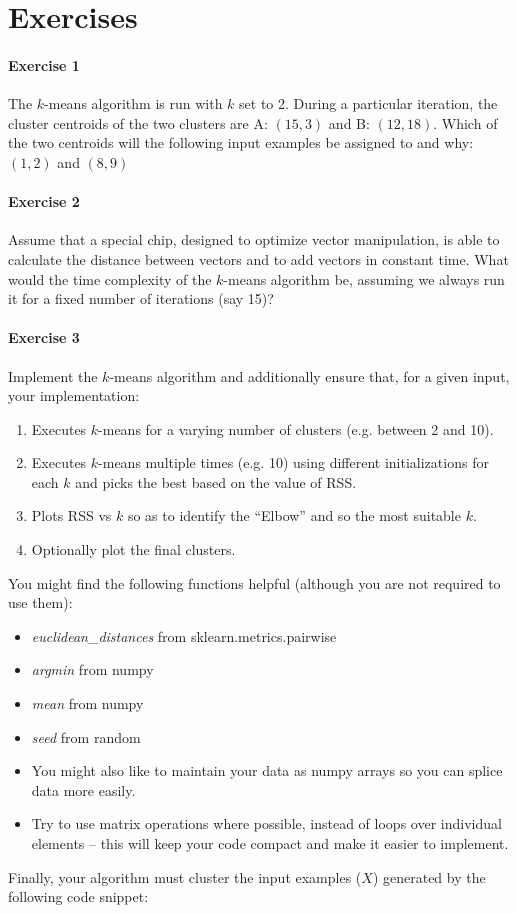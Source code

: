 \section{Exercises}

\paragraph{Exercise 1} 
The $k$-means algorithm is run with $k$ set to 2. During a particular iteration, the cluster centroids of the two clusters are A: $(15, 3)$ and B: $(12, 18)$. Which of the two centroids will the following input examples be assigned to and why: $(1, 2)$ and $(8, 9)$ 

\paragraph{Exercise 2}
Assume that a special chip, designed to optimize vector manipulation, is able to calculate the distance between vectors and to add vectors in constant time. What would the time complexity of the $k$-means algorithm be, assuming we always run it for a fixed number of iterations (say 15)?

\paragraph{Exercise 3} 
Implement the $k$-means algorithm and additionally ensure that, for a given input, your implementation: 
    \begin{enumerate}
        \item Executes $k$-means for a varying number of clusters (e.g. between 2 and 10).
        \item Executes $k$-means multiple times (e.g. 10) using different initializations for each $k$ and picks the best based on the value of RSS. 
        \item Plots RSS vs $k$ so as to identify the ``Elbow'' and so the most suitable $k$. 
        \item Optionally plot the final clusters.
    \end{enumerate}
    You might find the following functions helpful (although you are not required to use them): 
    \begin{itemize}
        \item \emph{euclidean\_distances} from sklearn.metrics.pairwise
        \item \emph{argmin} from numpy
        \item \emph{mean} from numpy 
        \item \emph{seed} from random
        \item You might also like to maintain your data as numpy arrays so you can splice data more easily. 
        \item Try to use matrix operations where possible, instead of loops over individual elements -- this will keep your code compact and make it easier to implement.
    \end{itemize}
    Finally, your algorithm must cluster the input examples ($X$) generated by the following code snippet: 

